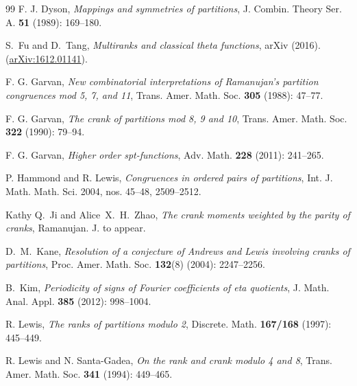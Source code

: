 \documentclass[12pt]{amsart}
\numberwithin{equation}{section}
\theoremstyle{plain}
\theoremstyle{definition}
\begin{document}
\begin{thebibliography}{99}
F. J. Dyson, \emph{Mappings and symmetries of partitions}, J. Combin. Theory Ser. A. \textbf{51} (1989): 169--180.

S.~Fu and D.~Tang, \emph{Multiranks and classical theta functions}, arXiv (2016). (\href{http://arXiv.org/abs/1612.01141}{arXiv:1612.01141}).

F. G. Garvan, \emph{New combinatorial interpretations of Ramanujan's partition congruences mod 5, 7, and 11}, Trans. Amer. Math. Soc. \textbf{305} (1988): 47--77.

F. G. Garvan, \emph{The crank of partitions mod 8, 9 and 10}, Trans. Amer. Math. Soc. \textbf{322} (1990): 79--94.

F. G. Garvan, \emph{Higher order spt-functions}, Adv. Math. \textbf{228} (2011): 241--265.

P. Hammond and R. Lewis, \emph{Congruences in ordered pairs of partitions}, Int. J. Math. Math. Sci. 2004, nos. 45--48, 2509--2512.

Kathy Q.~Ji and Alice~X.~H.~Zhao, \emph{The crank moments weighted by the parity of cranks}, Ramanujan. J. to appear.

D.~M.~Kane, \emph{Resolution of a conjecture of Andrews and Lewis involving cranks of partitions}, Proc. Amer. Math. Soc. \textbf{132}(8) (2004): 2247--2256.

B.~Kim, \emph{Periodicity of signs of Fourier coefficients of eta quotients},  J. Math. Anal. Appl. \textbf{385} (2012): 998--1004.

R. Lewis, \emph{The ranks of partitions modulo 2}, Discrete. Math. \textbf{167/168} (1997): 445--449.

R. Lewis and N. Santa-Gadea, \emph{On the rank and crank modulo 4 and 8}, Trans. Amer. Math. Soc. \textbf{341} (1994): 449--465.


\end{thebibliography}
\end{document}
